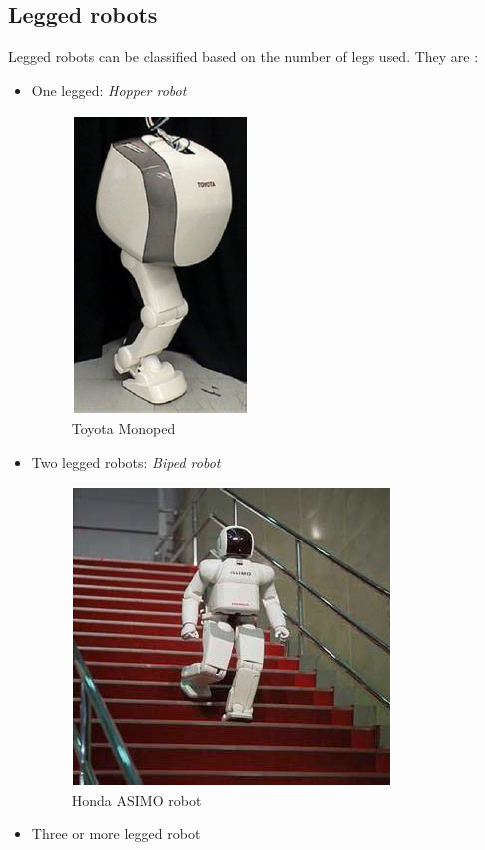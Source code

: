 \documentclass{report}
\begin{document}
\subsection{Legged robots}
Legged robots can be classified based on the number of legs used. They are :\\
\begin{itemize}
\item One legged: \emph{Hopper robot}
\begin{figure}[h!]
\centering
\includegraphics[scale=0.5]{p2}
\caption{Toyota Monoped}
\label{fig12}
\end{figure}   
\item Two legged robots: \emph{Biped robot}
\begin{figure}[h!]
\centering
\includegraphics[scale=0.5]{p3}
\caption{Honda ASIMO robot}
\label{fig13}
\end{figure}   
\item Three or more legged robot\\ 
\begin{figure}[h!]

\end{figure}
\end{itemize}
\end{document}
